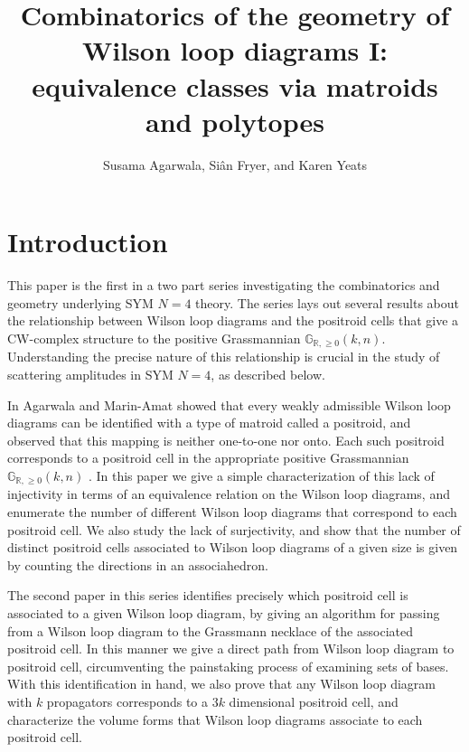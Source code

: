 \documentclass[11pt]{article}
\title{Combinatorics of the geometry of Wilson loop diagrams I: equivalence classes via matroids and polytopes}
\author{Susama Agarwala, Si\^an Fryer, and Karen Yeats}
\newcommand{\R}{\mathbb{R}}
\newcommand{\Gr}{\mathbb{G}_{\R, \geq 0}}
\theoremstyle{remark}
\theoremstyle{definition}
\begin{document}
\maketitle



\section{Introduction}

This paper is the first in a two part series investigating the combinatorics and geometry underlying SYM $N=4$ theory. The series lays out several results about the relationship between Wilson loop diagrams and the positroid cells that give a CW-complex structure to the positive Grassmannian $\Gr(k,n)$. Understanding the precise nature of this relationship is crucial in the study of scattering amplitudes in SYM $N=4$, as described below.

In \cite{wilsonloop} Agarwala and Marin-Amat showed that every weakly admissible Wilson loop diagrams can be identified with a type of matroid called a positroid, and observed that this mapping is neither one-to-one nor onto. Each such positroid corresponds to a positroid cell in the appropriate positive Grassmannian $\Gr(k,n)$ \cite{Postnikov}. In this paper we give a simple characterization of this lack of injectivity in terms of an equivalence relation on the Wilson loop diagrams, and enumerate the number of different Wilson loop diagrams that correspond to each positroid cell. We also study the lack of surjectivity, and show that the number of distinct positroid cells associated to Wilson loop diagrams of a given size is given by counting the directions in an associahedron. 

The second paper \cite{generalcombinatoricsII} in this series identifies precisely which positroid cell is associated to a given Wilson loop diagram, by giving an algorithm for passing from a Wilson loop diagram to the Grassmann necklace of the associated positroid cell. In this manner we give a direct path from Wilson loop diagram to positroid cell, circumventing the painstaking process of examining sets of bases. With this identification in hand, we also prove that any Wilson loop diagram with $k$ propagators corresponds to a $3k$ dimensional positroid cell, and characterize the volume forms that Wilson loop diagrams associate to each positroid cell.
\end{document}

